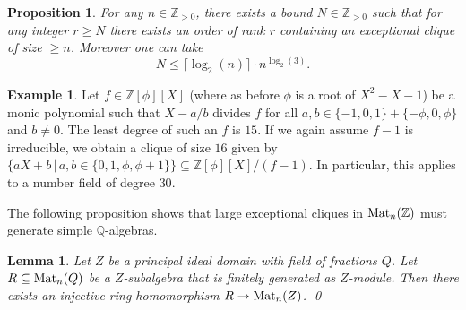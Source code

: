 \documentclass{amsart}
\theoremstyle{plain}
\newtheorem{lemma}[theorem]{Lemma}
\newtheorem{proposition}[theorem]{Proposition}
\theoremstyle{definition}
\newtheorem{example}[theorem]{Example}
\newcommand{\Z}{\ensuremath{\mathbb{Z}}}
\newcommand{\Q}{\ensuremath{\mathbb{Q}}}
\newcommand{\nrg}{R}
\begin{document}
\begin{proposition}
For any $n\in\Z_{>0}$, there exists a bound $N\in\Z_{>0}$ such that for any integer $r\ge N$ there exists an order of rank $r$ containing an exceptional clique of size $\ge n$. Moreover one can take $$N\le \lceil\log_2(n)\rceil\cdot n^{\log_2(3)}.$$
\end{proposition}

\begin{example}
	Let \(f\in\Z[\phi][X]\) (where as before $\phi$ is a root of $X^2-X-1$) be a monic polynomial such that \(X-a/b\) divides \(f\) for all \(a,b\in\{-1,0,1\}+\{-\phi,0,\phi\}\) and \(b\neq 0\). The least degree of such an \(f\) is \(15\). If we again assume \(f-1\) is irreducible, we obtain a clique of size \(16\) given by \(\{aX+b\,|\, a,b \in \{0,1,\phi,\phi+1\}\}\subseteq\Z[\phi][X]/(f-1)\). In particular, this applies to a number field of degree \(30\).
\end{example}

The following proposition shows that large exceptional cliques in \(\textup{Mat}_n(\Z)\) must generate simple \(\Q\)-algebras.

\begin{lemma}\label{lem:Q_to_Z}
	Let \(Z\) be a principal ideal domain with field of fractions \(Q\). 
	Let \(\nrg\subseteq\textup{Mat}_n(Q)\) be a \(Z\)-subalgebra that is finitely generated as \(Z\)-module. 
	Then there exists an injective ring homomorphism \(\nrg\to\textup{Mat}_n(Z)\). \qed
\end{lemma}
\end{document}

